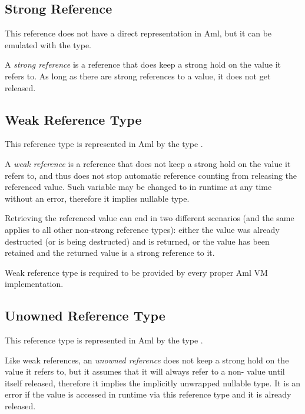 \subsection{Strong Reference}

This reference does not have a direct representation in Aml, but it can be emulated with the  type. 

A {\em strong reference} is a reference that does keep a strong hold on the value it refers to. As long as there are strong references to a value, it does not get released. 






\subsection{Weak Reference Type}

This reference type is represented in Aml by the type . 

A {\em weak reference} is a reference that does not keep a strong hold on the value it refers to, and thus does not stop automatic reference counting from releasing the referenced value. Such variable may be changed to  in runtime at any time without an error, therefore it implies nullable type. 

Retrieving the referenced value can end in two different scenarios (and the same applies to all other non-strong reference types): either the value was already destructed (or is being destructed) and  is returned, or the value has been retained and the returned value is a strong reference to it. 

Weak reference type is required to be provided by every proper Aml VM implementation. 





\subsection{Unowned Reference Type}

This reference type is represented in Aml by the type . 

Like weak references, an {\em unowned reference} does not keep a strong hold on the value it refers to, but it assumes that it will always refer to a non- value until itself released, therefore it implies the implicitly unwrapped nullable type. It is an error if the value is accessed in runtime via this reference type and it is already released. 

